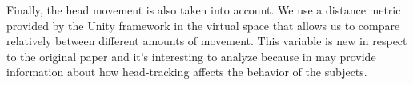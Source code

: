 Finally, the head movement is also taken into account. We use a distance
metric provided by the Unity framework in the virtual space that allows us
to compare relatively between different amounts of movement. This variable is new
in respect to the original paper and it's interesting to analyze because in
may provide information about how head-tracking affects the behavior of
the subjects.

